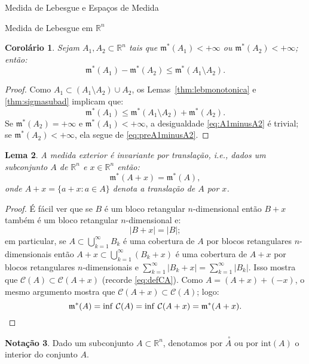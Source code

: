 \documentclass[oneside,final,11pt]{amsbook}
\newcommand{\R}{\mathds R}
\newcommand{\leb}{\mathfrak m}
\newcommand{\Int}{\mathrm{int}}
\theoremstyle{remark}\newtheorem{exercise}{Exercício}[chapter]
\theoremstyle{remark}\newtheorem{*exercise}[exercise]{\hbox to 0pt{\hskip 0pt minus 1fil*}Exercício}
\theoremstyle{definition}\newtheorem{exdefin}{Definição}[chapter]
\theoremstyle{plain}\newtheorem{teo}{Teorema}[section]
\theoremstyle{plain}\newtheorem{lem}[teo]{Lema}
\theoremstyle{plain}\newtheorem{prop}[teo]{Proposição}
\theoremstyle{plain}\newtheorem{cor}[teo]{Corolário}
\theoremstyle{definition}\newtheorem{defin}[teo]{Definição}
\theoremstyle{remark}\newtheorem{rem}[teo]{Observação}
\theoremstyle{definition}\newtheorem{notation}[teo]{Notação}
\theoremstyle{definition}\newtheorem{convention}[teo]{Convenção}
\theoremstyle{definition}\newtheorem{example}[teo]{Exemplo}
\numberwithin{section}{chapter}
\numberwithin{equation}{section}
\begin{document}
\begin{chapter}{Medida de Lebesgue e Espaços de Medida}
\begin{section}[Medida de Lebesgue em $\R^n$]{Medida de Lebesgue em ${\R^n}$}
\begin{cor}\label{thm:AminusB}
Sejam $A_1,A_2\subset\R^n$ tais que $\leb^*(A_1)<+\infty$ ou $\leb^*(A_2)<+\infty$; então:
\begin{equation}\label{eq:A1minusA2}
\leb^*(A_1)-\leb^*(A_2)\le\leb^*(A_1\setminus A_2).
\end{equation}
\end{cor}
\begin{proof}
Como $A_1\subset(A_1\setminus A_2)\cup A_2$, os Lemas~\ref{thm:lebmonotonica}
e \ref{thm:sigmasubad} implicam que:
\begin{equation}\label{eq:preA1minusA2}
\leb^*(A_1)\le\leb^*(A_1\setminus A_2)+\leb^*(A_2).
\end{equation}
Se $\leb^*(A_2)=+\infty$ e $\leb^*(A_1)<+\infty$, a desigualdade \eqref{eq:A1minusA2} é
trivial; se $\leb^*(A_2)<+\infty$, ela segue de \eqref{eq:preA1minusA2}.
\end{proof}

\begin{lem}\label{thm:extmeastransinv}
A medida exterior é {\em invariante por translação}, i.e., dados um subconjunto $A$ de $\R^n$ e $x\in\R^n$ então:
\[\leb^*(A+x)=\leb^*(A),\]
onde $A+x=\big\{a+x:a\in A\big\}$ denota a {\em translação}
de $A$ por $x$.
\end{lem}
\begin{proof}
É fácil ver que se $B$ é um bloco retangular $n$-di\-men\-sio\-nal então $B+x$ também é um bloco retangular $n$-dimensional
e:
\[\vert B+x\vert=\vert B\vert;\]
em particular, se $A\subset\bigcup_{k=1}^\infty B_k$ é uma cobertura de $A$ por
blocos retangulares $n$-dimensionais então $A+x\subset\bigcup_{k=1}^\infty(B_k+x)$ é uma cobertura de $A+x$ por blocos
retangulares $n$-dimensionais e $\sum_{k=1}^\infty\vert B_k+x\vert=\sum_{k=1}^\infty\vert B_k\vert$. Isso
mostra que $\mathcal C(A)\subset\mathcal C(A+x)$ (recorde \eqref{eq:defCA}). Como $A=(A+x)+({-x})$, o mesmo
argumento mostra que $\mathcal C(A+x)\subset\mathcal C(A)$; logo:
\[\leb^*(A)=\inf\,\mathcal C(A)=\inf\,\mathcal C(A+x)=\leb^*(A+x).\qedhere\]
\end{proof}

\begin{notation}
Dado um subconjunto $A\subset\R^n$, denotamos por $\overset{\;\circ}A$
ou por $\Int(A)$\index[simbolos]{$\Int(A)$} o interior do conjunto $A$.
\end{notation}


\end{section}
\end{chapter}
\end{document}
